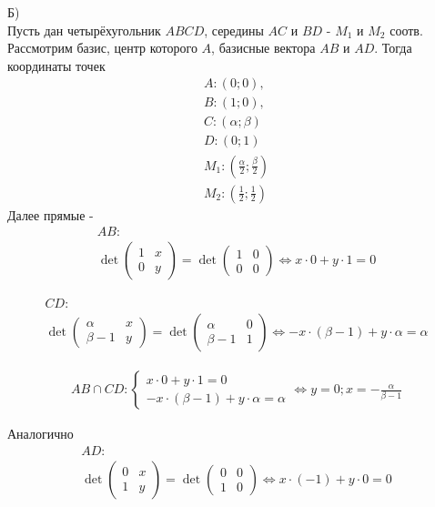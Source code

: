 		Б)\\		
		Пусть дан четырёхугольник $ABCD$, середины $AC$ и $BD$ - $M_1$ и $M_2$ соотв. Рассмотрим базис, центр которого $A$, базисные вектора $AB$ и $AD$. Тогда координаты точек\\
		\begin{gather*}
		A: (0;0),\\
		B : (1;0),\\
		C : (\alpha;\beta)\\
		D : (0;1)\\
		M_1 : (\frac{\alpha}{2};\frac{\beta}{2})\\ 
		M_2 : (\frac{1}{2};\frac{1}{2}) 
		\end{gather*}
		Далее прямые -\\ 
		\begin{gather*}
		AB:\\
		\det
		\begin{pmatrix}
			1 & x\\ 
			0 & y
		\end{pmatrix}
		 = \det 
		\begin{pmatrix}
			1 & 0\\ 
			0 & 0
		\end{pmatrix}
		\Leftrightarrow x \cdot 0 + y \cdot 1 = 0 		
		\end{gather*}
		 
		\begin{gather*}
		CD:\\
		\det
		\begin{pmatrix}
			\alpha & x\\ 
			\beta - 1 & y
		\end{pmatrix}
		= \det
		\begin{pmatrix}
			\alpha & 0\\ 
			\beta - 1 & 1
		\end{pmatrix}
		\Leftrightarrow -x \cdot (\beta - 1) + y \cdot \alpha = \alpha 
		\end{gather*}
		
		\begin{gather*}
		AB \cap CD:
			\begin{cases}
				x \cdot 0 + y \cdot 1 = 0\\ 
				-x \cdot (\beta - 1) + y \cdot \alpha = \alpha 
			\end{cases}
			\Leftrightarrow y = 0; x = -\frac{\alpha}{\beta - 1} 
		\end{gather*}
		
		Аналогично
		\begin{gather*}
		AD:\\
		\det
		\begin{pmatrix}
			0 & x\\ 
			1 & y
		\end{pmatrix}
		= \det
		\begin{pmatrix}
			0 & 0\\ 
			1 & 0
		\end{pmatrix}
		\Leftrightarrow x \cdot (-1) + y \cdot 0 = 0 
		\end{gather*}
		 
